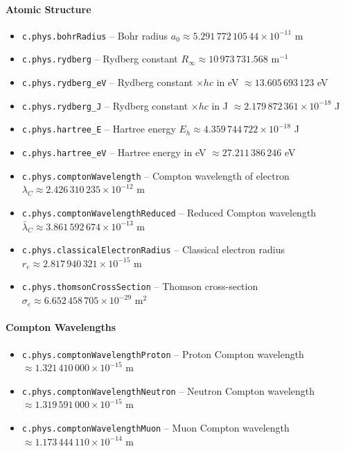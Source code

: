 \paragraph{Atomic Structure}
\begin{itemize}
\item \texttt{c.phys.bohrRadius} -- Bohr radius $a_0 \approx 5.291\,772\,105\,44 \times 10^{-11}$ m
\item \texttt{c.phys.rydberg} -- Rydberg constant $R_\infty \approx 10\,973\,731.568$ m$^{-1}$
\item \texttt{c.phys.rydberg\_eV} -- Rydberg constant $\times hc$ in eV $\approx 13.605\,693\,123$ eV
\item \texttt{c.phys.rydberg\_J} -- Rydberg constant $\times hc$ in J $\approx 2.179\,872\,361 \times 10^{-18}$ J
\item \texttt{c.phys.hartree\_E} -- Hartree energy $E_h \approx 4.359\,744\,722 \times 10^{-18}$ J
\item \texttt{c.phys.hartree\_eV} -- Hartree energy in eV $\approx 27.211\,386\,246$ eV
\item \texttt{c.phys.comptonWavelength} -- Compton wavelength of electron $\lambda_C \approx 2.426\,310\,235 \times 10^{-12}$ m
\item \texttt{c.phys.comptonWavelengthReduced} -- Reduced Compton wavelength $\bar{\lambda}_C \approx 3.861\,592\,674 \times 10^{-13}$ m
\item \texttt{c.phys.classicalElectronRadius} -- Classical electron radius $r_e \approx 2.817\,940\,321 \times 10^{-15}$ m
\item \texttt{c.phys.thomsonCrossSection} -- Thomson cross-section $\sigma_e \approx 6.652\,458\,705 \times 10^{-29}$ m$^2$
\end{itemize}

\paragraph{Compton Wavelengths}
\begin{itemize}
\item \texttt{c.phys.comptonWavelengthProton} -- Proton Compton wavelength $\approx 1.321\,410\,000 \times 10^{-15}$ m
\item \texttt{c.phys.comptonWavelengthNeutron} -- Neutron Compton wavelength $\approx 1.319\,591\,000 \times 10^{-15}$ m
\item \texttt{c.phys.comptonWavelengthMuon} -- Muon Compton wavelength $\approx 1.173\,444\,110 \times 10^{-14}$ m
\end{itemize}

